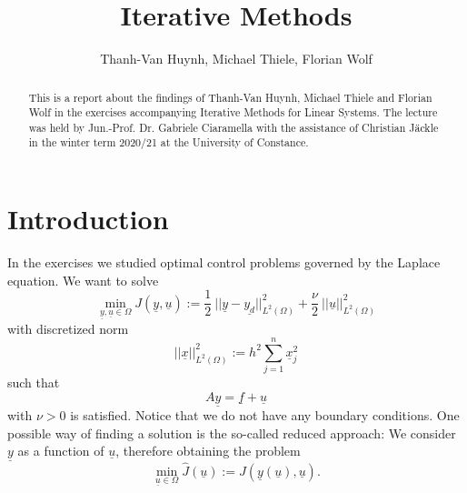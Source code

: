 \documentclass{amsart}
\theoremstyle{definition}
\theoremstyle{remark}
\numberwithin{equation}{section}
\begin{document}
\title{Iterative Methods}

\author{Thanh-Van Huynh, Michael Thiele, Florian Wolf}


\begin{abstract}
	This is a report about the findings of Thanh-Van Huynh, Michael Thiele and Florian Wolf in the exercises accompanying Iterative Methods for Linear Systems. The lecture was held by Jun.-Prof. Dr. Gabriele Ciaramella with the assistance of Christian Jäckle in the winter term 2020/21 at the University of Constance.
\end{abstract}

\maketitle

\tableofcontents



\section{Introduction}
In the exercises we studied optimal control problems governed by the Laplace equation. We want to solve
\begin{equation*}
\min\limits_{\underline{y},\underline{u}\in\Omega} J(\underline{y},\underline{u}) := \frac{1}{2}\ ||\underline{y}-\underline{y_d}||_{L^2(\Omega)}^2 + \frac{\nu}{2}\ ||\underline{u}||_{L^2(\Omega)}^2
\end{equation*}
with discretized norm
\begin{equation*}
||\underline{x}||_{L^2(\Omega)}^2 := h^2 \sum\limits_{j=1}^n \underline{x}_j^2
\end{equation*}
such that
\begin{equation*}
A\underline{y}=\underline{f}+\underline{u}
\end{equation*}
with $\nu>0$ is satisfied. Notice that we do not have any boundary conditions. One possible way of finding a solution is the so-called reduced approach: We consider $\underline{y}$ as a function of $\underline{u}$, therefore obtaining the problem
\begin{equation*}
\min\limits_{\underline{u}\in\Omega} \hat{J}(\underline{u}) := J(\underline{y}(\underline{u}),\underline{u}).
\end{equation*}
\end{document}
